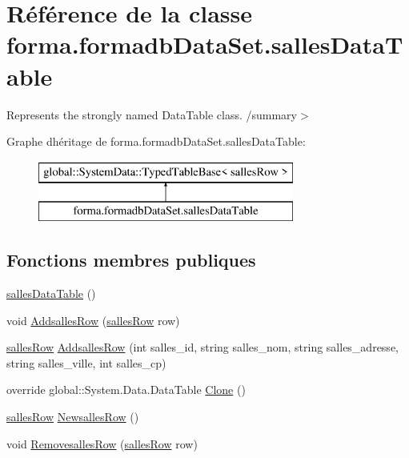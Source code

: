 \hypertarget{classforma_1_1formadb_data_set_1_1salles_data_table}{}\section{Référence de la classe forma.\+formadb\+Data\+Set.\+salles\+Data\+Table}
\label{classforma_1_1formadb_data_set_1_1salles_data_table}


Represents the strongly named Data\+Table class. /summary$>$  


Graphe d\textquotesingle{}héritage de forma.\+formadb\+Data\+Set.\+salles\+Data\+Table\+:\begin{figure}[H]
\begin{center}
\leavevmode
\includegraphics[height=2.000000cm]{classforma_1_1formadb_data_set_1_1salles_data_table}
\end{center}
\end{figure}
\subsection*{Fonctions membres publiques}
\begin{DoxyCompactItemize}
\item 
\hyperlink{classforma_1_1formadb_data_set_1_1salles_data_table_a5ef227a678e56921693ae6b6779b0005}{salles\+Data\+Table} ()
\item 
void \hyperlink{classforma_1_1formadb_data_set_1_1salles_data_table_a4452825eecd136d4ea8855a88b871586}{Addsalles\+Row} (\hyperlink{classforma_1_1formadb_data_set_1_1salles_row}{salles\+Row} row)
\item 
\hyperlink{classforma_1_1formadb_data_set_1_1salles_row}{salles\+Row} \hyperlink{classforma_1_1formadb_data_set_1_1salles_data_table_a634575b8716ad90211d79f639882c1c4}{Addsalles\+Row} (int salles\+\_\+id, string salles\+\_\+nom, string salles\+\_\+adresse, string salles\+\_\+ville, int salles\+\_\+cp)
\item 
override global\+::\+System.\+Data.\+Data\+Table \hyperlink{classforma_1_1formadb_data_set_1_1salles_data_table_a73d26ee17ed18352e32045d4ee2755ca}{Clone} ()
\item 
\hyperlink{classforma_1_1formadb_data_set_1_1salles_row}{salles\+Row} \hyperlink{classforma_1_1formadb_data_set_1_1salles_data_table_a3418f3b102d87ba89dfbcac11f2400f9}{Newsalles\+Row} ()
\item 
void \hyperlink{classforma_1_1formadb_data_set_1_1salles_data_table_acae69151830ddb218606786c816d8599}{Removesalles\+Row} (\hyperlink{classforma_1_1formadb_data_set_1_1salles_row}{salles\+Row} row)
\end{DoxyCompactItemize}
